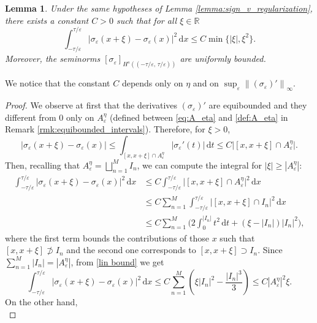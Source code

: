 \documentclass{article}
\newtheorem{Lemma}[Theorem]{Lemma}
\theoremstyle{definition}
\newcommand{\norm}[1]{\left\lVert #1 \right\rVert}
\newcommand{\abs}[1]{\left|#1\right|}
\newcommand{\de}{\mathrm{d}}
\newcommand{\R}{\mathbb{R}}
\newcommand{\e}{\varepsilon}
\def\e{\varepsilon}
\begin{document}
\begin{Lemma}
\label{sigma Hs bound}
   Under the same hypotheses of Lemma \ref{lemma:sign_v_regularization}, there exists a constant $C>0$ such that for all $\xi\in \R$ 
   \begin{equation}
   \label{sigma trasl dist bound}
       \int_{-\tau/\e}^{\tau/\e} \abs{\sigma_\e(x+\xi) - \sigma_\e(x)}^2\,\de x\leq C \min\{|\xi|,\xi^2\}.
   \end{equation}
    Moreover, the seminorms $[\sigma_\e]_{H^s((-\tau/\e,\,\tau/\e))}$ are uniformly bounded.
\end{Lemma}
We notice that the constant $C$ depends only on $\eta$ and on $\sup_\e \norm{(\sigma_\e)'}_\infty$.
\begin{proof}
    We observe at first that the derivatives $(\sigma_\e)'$ are equibounded and they different from $0$ only on $A_\e^\eta$ (defined between \eqref{eq:A_eta} and \eqref{def:A_eta} in Remark \ref{rmk:equibounded_intervals}). Therefore, for $\xi>0$,
    \[
        \abs{\sigma_\e(x+\xi) - \sigma_\e(x)} \leq \int_{[x,{x+\xi}] \cap A^\eta_\e}\abs{\sigma_\e'(t)}\,\de t \leq C \big |[x,x+\xi] \cap A^\eta_\e\big|.
    \]
    Then, recalling that $A_\e^\eta = \bigsqcup_{n=1}^M I_n$, we can compute the integral for $|\xi| \geq |A_\e^\eta|$: 
    \begin{equation}
    \label{lin bound}
        \begin{split}
            \int_{-\tau/\e}^{\tau/\e} \abs{\sigma_\e(x+\xi) - \sigma_\e(x)}^2\,\de x 
            &\leq C\int_{-\tau/\e}^{\tau/\e}\big |[x,x+\xi] \cap A_\e^\eta\big|^2\,\de x\\
            & \leq C \sum_{n=1}^M \int_{-\tau/\e}^{\tau/\e} \big |[x,x+\xi] \cap I_n\big|^2\,\de x\\
            &\leq C\sum_{n=1}^M \Big( 2\int_0^{|I_n|}t^2\,\de t + (\xi- |I_n|)|I_n|^2 \Big),
        \end{split}
    \end{equation}    
    where the first term bounds the contributions of those $x$ such that $[x,x+\xi] \not\supset I_n$ and the second one corresponds to $[x,x+\xi] \supset I_n$. Since $\sum_{n=1}^M|I_n|=|A_\e^\eta|$, from \eqref{lin bound} we get
     \begin{equation}
    \label{lin bound2}
            \int_{-\tau/\e}^{\tau/\e} \abs{\sigma_\e(x+\xi) - \sigma_\e(x)}^2\,\de x \leq C\sum_{n=1}^M\left(\xi|I_n|^2-\frac{|I_n|^3}{3}\right)\leq C |A^\eta_\e|^2 \xi.
    \end{equation}      
    On the other hand,
  \begin{equation}

\end{equation}
\end{proof}
\end{document}
